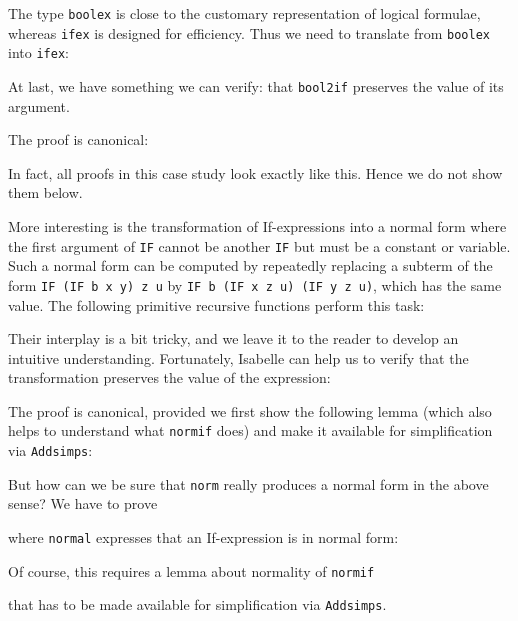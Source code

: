 The type \texttt{boolex} is close to the customary representation of logical
formulae, whereas \texttt{ifex} is designed for efficiency. Thus we need to
translate from \texttt{boolex} into \texttt{ifex}:
\begin{ttbox}
\end{ttbox}
At last, we have something we can verify: that \texttt{bool2if} preserves the
value of its argument.
\begin{ttbox}
\end{ttbox}
The proof is canonical:
\begin{ttbox}
\end{ttbox}
In fact, all proofs in this case study look exactly like this. Hence we do
not show them below.

More interesting is the transformation of If-expressions into a normal form
where the first argument of \texttt{IF} cannot be another \texttt{IF} but
must be a constant or variable. Such a normal form can be computed by
repeatedly replacing a subterm of the form \texttt{IF~(IF~b~x~y)~z~u} by
\texttt{IF b (IF x z u) (IF y z u)}, which has the same value. The following
primitive recursive functions perform this task:
\begin{ttbox}

\end{ttbox}
Their interplay is a bit tricky, and we leave it to the reader to develop an
intuitive understanding. Fortunately, Isabelle can help us to verify that the
transformation preserves the value of the expression:
\begin{ttbox}
\end{ttbox}
The proof is canonical, provided we first show the following lemma (which
also helps to understand what \texttt{normif} does) and make it available
for simplification via \texttt{Addsimps}:
\begin{ttbox}
\end{ttbox}

But how can we be sure that \texttt{norm} really produces a normal form in
the above sense? We have to prove
\begin{ttbox}
\end{ttbox}
where \texttt{normal} expresses that an If-expression is in normal form:
\begin{ttbox}
\end{ttbox}
Of course, this requires a lemma about normality of \texttt{normif}
\begin{ttbox}
\end{ttbox}
that has to be made available for simplification via \texttt{Addsimps}.

